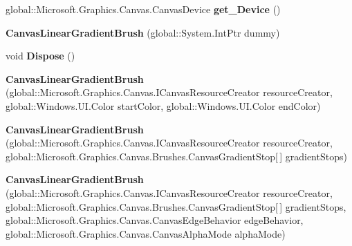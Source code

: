 \begin{DoxyCompactItemize}
global\+::\+Microsoft.\+Graphics.\+Canvas.\+Canvas\+Device {\bfseries get\+\_\+\+Device} ()
\item 
\mbox{\label{class_microsoft_1_1_graphics_1_1_canvas_1_1_brushes_1_1_canvas_linear_gradient_brush_a20aa86e5b7a32843e8561c0415dbee83}} 
{\bfseries Canvas\+Linear\+Gradient\+Brush} (global\+::\+System.\+Int\+Ptr dummy)
\item 
\mbox{\label{class_microsoft_1_1_graphics_1_1_canvas_1_1_brushes_1_1_canvas_linear_gradient_brush_af7428e4f8e3d528affde23a40ae75b52}} 
void {\bfseries Dispose} ()
\item 
\mbox{\label{class_microsoft_1_1_graphics_1_1_canvas_1_1_brushes_1_1_canvas_linear_gradient_brush_a4b33cfab37ecd3d6b6bef46dae48c88c}} 
{\bfseries Canvas\+Linear\+Gradient\+Brush} (global\+::\+Microsoft.\+Graphics.\+Canvas.\+I\+Canvas\+Resource\+Creator resource\+Creator, global\+::\+Windows.\+U\+I.\+Color start\+Color, global\+::\+Windows.\+U\+I.\+Color end\+Color)
\item 
\mbox{\label{class_microsoft_1_1_graphics_1_1_canvas_1_1_brushes_1_1_canvas_linear_gradient_brush_a60887ec32c82a971148a38aea74b62ea}} 
{\bfseries Canvas\+Linear\+Gradient\+Brush} (global\+::\+Microsoft.\+Graphics.\+Canvas.\+I\+Canvas\+Resource\+Creator resource\+Creator, global\+::\+Microsoft.\+Graphics.\+Canvas.\+Brushes.\+Canvas\+Gradient\+Stop\mbox{[}$\,$\mbox{]} gradient\+Stops)
\item 
\mbox{\label{class_microsoft_1_1_graphics_1_1_canvas_1_1_brushes_1_1_canvas_linear_gradient_brush_a84d29f89ab093f50d09215ddab09cbf1}} 
{\bfseries Canvas\+Linear\+Gradient\+Brush} (global\+::\+Microsoft.\+Graphics.\+Canvas.\+I\+Canvas\+Resource\+Creator resource\+Creator, global\+::\+Microsoft.\+Graphics.\+Canvas.\+Brushes.\+Canvas\+Gradient\+Stop\mbox{[}$\,$\mbox{]} gradient\+Stops, global\+::\+Microsoft.\+Graphics.\+Canvas.\+Canvas\+Edge\+Behavior edge\+Behavior, global\+::\+Microsoft.\+Graphics.\+Canvas.\+Canvas\+Alpha\+Mode alpha\+Mode)

\end{DoxyCompactItemize}
